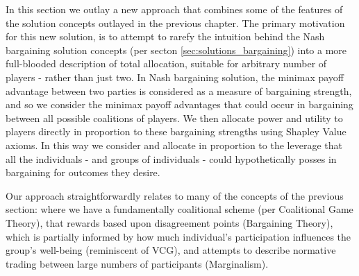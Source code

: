 In this section we outlay a new approach that combines some of the features of the solution concepts outlayed in the previous chapter.
The primary motivation for this new solution, is to attempt to rarefy the intuition behind the Nash bargaining solution concepts (per secton \ref{sec:solutions_bargaining}) into a more full-blooded description of total allocation, suitable for arbitrary number of players - rather than just two.
In Nash bargaining solution, the minimax payoff advantage between two parties is considered as a measure of bargaining strength, and so we consider the minimax payoff advantages that could occur in bargaining between all possible coalitions of players.
We then allocate power and utility to players directly in proportion to these bargaining strengths using Shapley Value axioms.
In this way we consider and allocate in proportion to the leverage that all the individuals - and groups of individuals - could hypothetically posses in bargaining for outcomes they desire.

Our approach straightforwardly relates to many of the concepts of the previous section: where we have a fundamentally coalitional scheme (per Coalitional Game Theory), that rewards based upon disagreement points (Bargaining Theory), which is partially informed by how much individual's participation influences the group's well-being (reminiscent of VCG), and attempts to describe normative trading between large numbers of participants (Marginalism).





